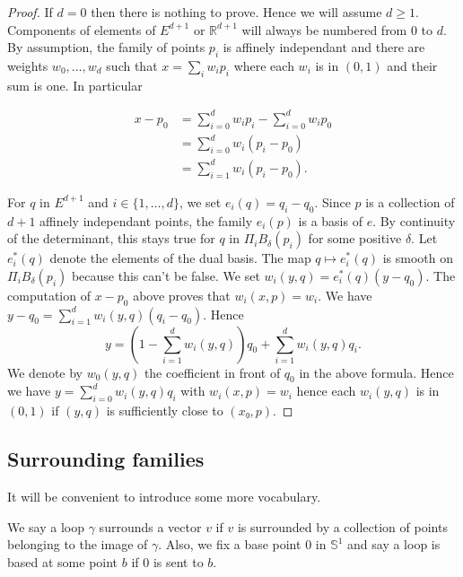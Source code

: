 \begin{proof}
  If $d = 0$ then there is nothing to prove.
  Hence we will assume $d ≥ 1$.
  Components of elements of $E^{d+1}$ or $ℝ^{d+1}$ will always be
  numbered from $0$ to $d$.
  By assumption, the family of points $p_i$ is affinely independant and
  there are weights $w_0, \dots, w_d$ such that $x = \sum_i w_i p_i$
  where each $w_i$ is in $(0, 1)$ and their sum is one.
  In particular

  \begin{align*}
    x - p_0 &= \sum_{i=0}^d w_i p_i - \sum_{i=0}^d w_i p_0 \\
            & = \sum_{i=0}^d w_i (p_i - p_0) \\
            & = \sum_{i=1}^d w_i (p_i - p_0).
  \end{align*}

  For $q$ in $E^{d+1}$ and $i ∈ \{1, \dots, d\}$, we set
  $e_i(q) = q_i - q_0$.
  Since $p$ is a collection of $d+1$ affinely independant points,
  the family $e_i(p)$ is a basis of $e$.
  By continuity of the determinant, this stays true
  for $q$ in $Π_i B_δ(p_i)$ for some positive $δ$.
  Let $e^*_i(q)$ denote the elements of the dual basis.
  The map $q ↦ e^*_i(q)$ is smooth on $Π_i B_δ(p_i)$ because this can't
  be false.
  We set $w_i(y, q) = e^*_i(q)(y - q_0)$.
  The computation of $x - p_0$ above proves that
  $w_i(x, p) = w_i$.
  We have $y - q_0 = \sum_{i = 1}^d w_i(y, q)(q_i - q_0)$.
  Hence
  \[
    y = \left(1 - \sum_{i = 1}^d w_i(y, q)\right)q_0 +
        \sum_{i = 1}^d w_i(y, q)q_i.
  \]
  We denote by $w_0(y, q)$ the coefficient in front of $q_0$ in the
  above formula.
  Hence we have $y = \sum_{i=0}^d w_i(y, q)q_i$ with
  $w_i(x, p) = w_i$ hence each $w_i(y, q)$ is in $(0, 1)$
  if $(y, q)$ is sufficiently close to $(x₀, p)$.
\end{proof}

\subsection{Surrounding families}
\label{sub:surrounding_families}

It will be convenient to introduce some more vocabulary.

\begin{definition}
  \label{def:surrounds}
  We say a loop $γ$ surrounds a vector $v$ if $v$ is surrounded
  by a collection of points belonging to the image of $γ$.
  Also, we fix a base point $0$ in $𝕊^1$ and say a loop is based at some
  point $b$ if $0$ is sent to $b$.
\end{definition}

